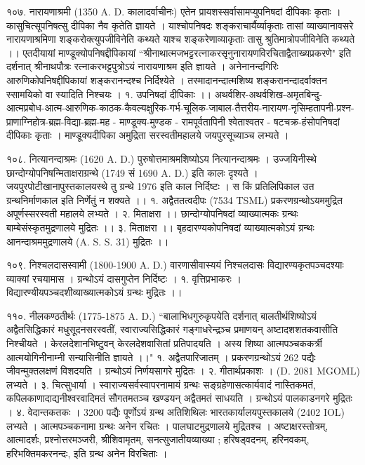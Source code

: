 १०७. नारायणाश्रमी (1350 A. D. कालादर्वाचीनः)
एतेन प्रायशस्सर्वासामप्युपनिषदां दीपिकाः कृताः । कासुचित्सूपनिषत्सु दीपिका नैव कृतेति ज्ञायते । याश्चोपनिषदः शङ्कराचार्यैर्व्याकृताः तासां व्याख्यानावसरे नारायणाश्रमिणा शङ्करोक्त्युपजीविनेति कथ्यते याश्च शङ्करेणाव्याकृताः तासु श्रुतिमात्रोपजीविनेति कथ्यते ।। एतदीयायां माण्डूक्योपनिषद्दीपिकायां ``श्रीनाथात्मजभट्टरत्नाकरसृनुनारायणविरचिताद्वैताख्यप्रकरणे" इति दर्शनात् श्रीनाथपौत्रः रत्नाकरभट्टपुत्रोऽयं नारायणाश्रम इति ज्ञायते । अनेनानन्दगिरिः आरुणिकोपनिषद्दीपिकायां शङ्करानन्दश्च निर्दिश्येते । तस्मादानन्दात्मशिष्य शङ्करानन्दादर्वाक्तन स्सामयिको वा स्यादिति निश्चयः ।
१. उपनिषदां दीपिकाः ।।
अथर्वशिर-अथर्वशिख-अमृतबिन्दु-आत्मप्रबोध-आत्म-आरुणिक-काठक-कैवल्यक्षुरिक-गर्भ-चूलिक-जाबाल-तैत्तरीय-नारायण-नृसिम्हतापनी-प्रश्न-प्राणाग्निहोत्र-ब्रह्म-विद्या-ब्रह्म-मह - माण्डूक्य-मुण्डक - रामपूर्वतापिनी श्वेताश्वतर - षटचक्र-हंसोपनिषदां दीपिकाः कृताः । माण्डूक्यदीपिका अमुद्रिता सरस्वतीमहालये जयपुरसूच्याञ्च लभ्यते ।

१०८. नित्यानन्दाश्रमः (1620 A. D.)
पुरुषोत्तमाश्रमशिष्योऽय नित्यानन्दाश्रमः । उज्जयिनीस्थे छान्दोग्योपनिषन्मिताक्षराग्रन्थे (1749 सं 1690 A. D.) इति कालः दृश्यते । जयपुरपोटीखानापुस्तकालयस्थे तु ग्रन्थे 1976 इति काल निर्दिष्टः । स किं प्रतिलिपिकाल उत ग्रन्थनिर्माणकाल इति निर्णेतुं न शक्यते ।।
१. अद्वैततत्वदीपः (7534 TSML) प्रकरणग्रन्थोऽयममुद्रित अपूर्णस्सरस्वती महालये लभ्यते ।
२. मिताक्षरा ।। छान्दोग्योपनिषदां व्याख्यात्मकः ग्रन्थः बाम्बेसंस्कृतमुद्रणालये मुद्रितः ।।
३. मिताक्षरा ।। बृहदारण्यकोपनिषदां व्याख्यात्मकोऽयं ग्रन्थः आनन्दाश्रममुद्रणालये (A. S. S. 31) मुद्रितः ।।

१०९. निश्चलदासस्वामी (1800-1900 A. D.)
वारणासीवास्ययं निश्चलदासः विद्यारण्यकृतपञ्चदश्याः व्याक्यां रचयामास । ग्रन्थोऽयं दासगुप्तेन निर्दिष्टः ।
१. वृत्तिप्रभाकरः । विद्यारण्यीयपञ्चदशीव्याख्यात्मकोऽयं ग्रन्थः मुद्रितः ।।

११०. नीलकण्ठतीर्थः (1775-1875 A. D.)
``बालाभिधगुरुकृपयेति दर्शनात् बालतीर्थशिष्योऽयं अद्वैतसिद्धिकारं मधुसूदनसरस्वतीं, स्वाराज्यसिद्धिकारं गङ्गाधरेन्द्रञ्च प्रमाणयन् अष्टादशशतकवासीति निश्चीयते । केरलदेशानभिष्टुवन् केरलदेशवासितां प्रतिपादयति । अस्य शिष्या आत्मपञ्चककर्त्री आत्मयोगिनीनाम्नी सन्यासिनीति ज्ञायते ।।"
१. अद्वैतपारिजातम् । प्रकरणग्रन्थोऽयं 262 पद्यैः जीवन्मुक्तलक्षणं विशदयति । ग्रन्थोऽयं निर्णयसागरे मुद्रितः ।
२. गीतार्थप्रकाशः । (D. 2081 MGOML) लभ्यते । 
३. चित्सुधार्या । स्वाराज्यसर्वस्वापरनामायं ग्रन्थः सङ्ग्रहेणासत्कार्यवादं नास्तिकमतं, कपिलकाणादाद्यनीश्वरवादिमतं सौगतमतञ्च खण्डयन् अद्वैतमतं साधयति । ग्रन्थोऽयं पालकाडनगरे मुद्रितः ।
४. वेदान्तकतकः । 3200 पद्यैः पूर्णोऽयं ग्रन्थ अतिशिथिलः भारतकार्यालयपुस्तकालये (2402 IOL) लभ्यते । आत्मपञ्चकनामा ग्रन्थः अनेन रचितः । पालघाटमुद्रणालये मुद्रितश्च ।
अष्टाक्षरस्तोत्रम्, आत्मादर्शः, प्रश्नोत्तरमञ्जरी, श्रीशिवामृतम्, सनत्सुजातीयव्याख्या ; हरिषड्वदनम्,  हरिनवकम्, हरिभक्तिमकरनन्दः, इति ग्रन्थ अनेन विरचिताः ।

